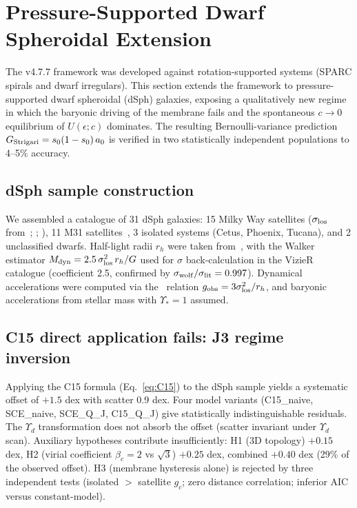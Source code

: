 \documentclass[11pt,a4paper]{article}
\newcommand{\gobs}{g_{\rm obs}}
\newcommand{\gc}{g_{c}}
\newcommand{\ao}{a_{0}}
\newcommand{\Yd}{\Upsilon_{d}}
\newcommand{\Ys}{\Upsilon_{\ast}}
\newcommand{\so}{s_{0}}
\newcommand{\siglos}{\sigma_{\rm los}}
\newcommand{\rh}{r_{h}}
\newcommand{\Mdyn}{M_{\rm dyn}}
\newcommand{\Gstr}{G_{\rm Strigari}}
\begin{document}
\section{Pressure-Supported Dwarf Spheroidal Extension}

The v4.7.7 framework was developed against rotation-supported systems (SPARC spirals and dwarf irregulars).
This section extends the framework to pressure-supported dwarf spheroidal (dSph) galaxies, exposing a
qualitatively new regime in which the baryonic driving of the membrane fails and the spontaneous $c \to 0$
equilibrium of $U(\epsilon; c)$ dominates. The resulting Bernoulli-variance prediction
$\Gstr = \so(1 - \so)\,\ao$ is verified in two statistically independent populations to 4--5\% accuracy.

\subsection{dSph sample construction}
We assembled a catalogue of 31 dSph galaxies: 15 Milky Way satellites ($\siglos$ from~\citealt{Walker2009};
\citealt{SimonGeha2007}; \citealt{Simon2019}), 11 M31 satellites~\citep{Collins2013, Tollerud2012}, 3
isolated systems (Cetus, Phoenix, Tucana), and 2 unclassified dwarfs. Half-light radii $\rh$ were taken
from~\citet{McConnachie2012}, with the Walker estimator $\Mdyn = 2.5\,\siglos^2\,\rh/G$ used for $\sigma$
back-calculation in the VizieR catalogue (coefficient 2.5, confirmed by
$\sigma_{\rm wolf}/\sigma_{\rm lit} = 0.997$). Dynamical accelerations were computed via the~\citet{Wolf2010}
relation $\gobs = 3\siglos^2/\rh$, and baryonic accelerations from stellar mass with $\Ys = 1$ assumed.

\subsection{C15 direct application fails: J3 regime inversion}
Applying the C15 formula (Eq.~\ref{eq:C15}) to the dSph sample yields a systematic offset of $+1.5$ dex with
scatter 0.9 dex. Four model variants (C15\_naive, SCE\_naive, SCE\_Q\_J, C15\_Q\_J) give statistically
indistinguishable residuals. The $\Yd$ transformation does not absorb the offset (scatter invariant under
$\Yd$ scan). Auxiliary hypotheses contribute insufficiently: H1 (3D topology) $+0.15$ dex, H2 (virial
coefficient $\beta_c = 2$ vs $\sqrt{3}$) $+0.25$ dex, combined $+0.40$ dex (29\% of the observed offset).
H3 (membrane hysteresis alone) is rejected by three independent tests (isolated $>$ satellite $\gc$; zero
distance correlation; inferior AIC versus constant-model).
\end{document}
